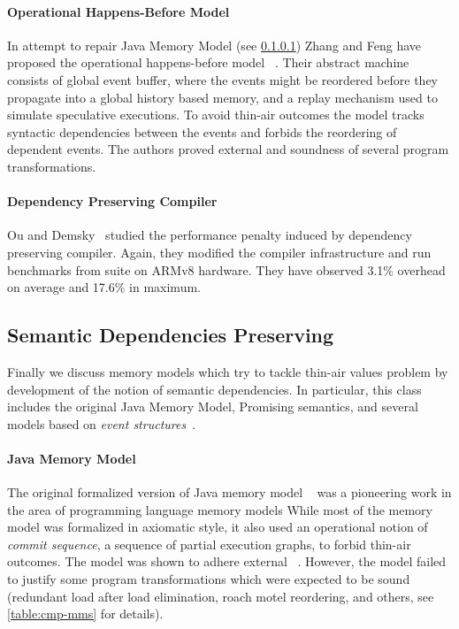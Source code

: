\paragraph{Operational Happens-Before Model}

In attempt to repair Java Memory Model (see \cref{sec:catalog:jmm})
Zhang and Feng have proposed the 
operational happens-before model \OHMM~\cite{Zhang-Feng:FCS16}.
Their abstract machine consists of global event buffer,
where the events might be reordered before they propagate into  
a global history based memory, and a replay mechanism 
used to simulate speculative executions. 
To avoid thin-air outcomes the model tracks syntactic dependencies 
between the events and forbids the reordering of dependent events. 
The authors proved external \DRF and soundness of several 
program transformations. 

\paragraph{Dependency Preserving Compiler}

Ou and Demsky~\cite{Ou-Demsky:OOPSLA18} studied 
the performance penalty induced by dependency preserving compiler. 
Again, they modified the \LLVM compiler infrastructure 
and run benchmarks from \SPECCPU suite on ARMv8 hardware. 
They have observed 3.1\% overhead on average and 17.6\% in maximum. 

\subsection{Semantic Dependencies Preserving}
\label{sec:catalog:sdeprf}

Finally we discuss memory models 
which try to tackle thin-air values problem 
by development of the notion of semantic dependencies. 
In particular, this class includes the original Java Memory Model, 
Promising semantics, and several models based 
on \emph{event structures}~\cite{Winskel:86}.

\paragraph{Java Memory Model}
\label{sec:catalog:jmm}

The original formalized version of Java memory model \JMM~\cite{Manson-al:POPL05}
was a pioneering work in the area of programming language memory models 
While most of the memory model was formalized in axiomatic style, 
it also used an operational notion of \emph{commit sequence}, 
\ie a sequence of partial execution graphs, to forbid thin-air outcomes. 
The model was shown to adhere external \DRF~\cite{Huisman-Petri:CONCUR07}.
However, the model failed to justify some program transformations 
which were expected to be sound~\cite{Sevcik-Aspinall:ECOOP08} 
(\eg redundant load after load elimination, roach motel reordering, and others,
see \cref{table:cmp-mms} for details). 


